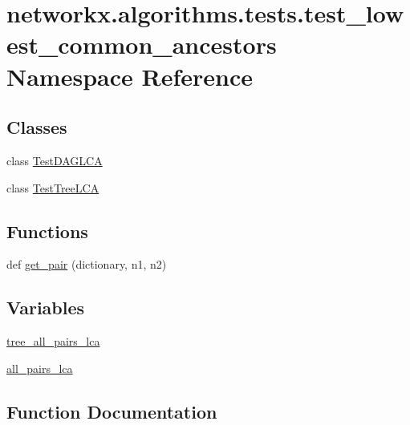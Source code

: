 \hypertarget{namespacenetworkx_1_1algorithms_1_1tests_1_1test__lowest__common__ancestors}{}\section{networkx.\+algorithms.\+tests.\+test\+\_\+lowest\+\_\+common\+\_\+ancestors Namespace Reference}
\label{namespacenetworkx_1_1algorithms_1_1tests_1_1test__lowest__common__ancestors}
\subsection*{Classes}
\begin{DoxyCompactItemize}
\item 
class \hyperlink{classnetworkx_1_1algorithms_1_1tests_1_1test__lowest__common__ancestors_1_1TestDAGLCA}{Test\+D\+A\+G\+L\+CA}
\item 
class \hyperlink{classnetworkx_1_1algorithms_1_1tests_1_1test__lowest__common__ancestors_1_1TestTreeLCA}{Test\+Tree\+L\+CA}
\end{DoxyCompactItemize}
\subsection*{Functions}
\begin{DoxyCompactItemize}
\item 
def \hyperlink{namespacenetworkx_1_1algorithms_1_1tests_1_1test__lowest__common__ancestors_a2e9edd9457414881f8253f13ad420682}{get\+\_\+pair} (dictionary, n1, n2)
\end{DoxyCompactItemize}
\subsection*{Variables}
\begin{DoxyCompactItemize}
\item 
\hyperlink{namespacenetworkx_1_1algorithms_1_1tests_1_1test__lowest__common__ancestors_aa2a46f9af4c7a7a4ce8a31a5fb131bd5}{tree\+\_\+all\+\_\+pairs\+\_\+lca}
\item 
\hyperlink{namespacenetworkx_1_1algorithms_1_1tests_1_1test__lowest__common__ancestors_a554d9f0fefd010cbb51ff02481242427}{all\+\_\+pairs\+\_\+lca}
\end{DoxyCompactItemize}


\subsection{Function Documentation}
\mbox{\label{namespacenetworkx_1_1algorithms_1_1tests_1_1test__lowest__common__ancestors_a2e9edd9457414881f8253f13ad420682}} 
